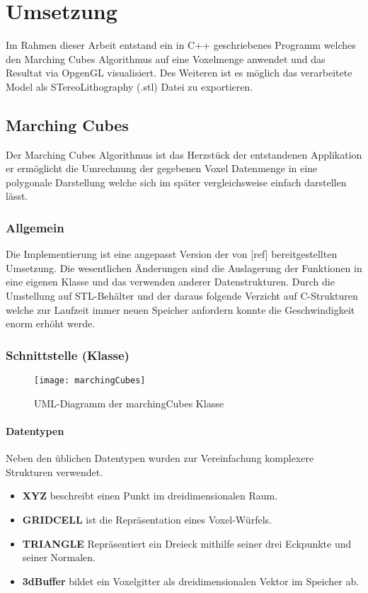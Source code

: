\chapter{Umsetzung}
Im Rahmen dieser Arbeit entstand ein in C++ geschriebenes Programm welches den Marching Cubes Algorithmus auf eine Voxelmenge anwendet und das Resultat via OpgenGL visualisiert. Des Weiteren ist es möglich das verarbeitete Model als STereoLithography (.stl) Datei zu exportieren.
\section{Marching Cubes}
Der Marching Cubes Algorithmus ist das Herzstück der entstandenen Applikation er ermöglicht die Umrechnung der gegebenen Voxel Datenmenge in eine polygonale Darstellung welche sich im später vergleichsweise einfach darstellen lässt.
\subsection{Allgemein}
Die Implementierung ist eine angepasst Version der von [ref] bereitgestellten Umsetzung. Die wesentlichen Änderungen sind die Auslagerung der Funktionen in eine eigenen Klasse und das verwenden anderer Datenstrukturen. Durch die Umstellung auf STL-Behälter und der daraus folgende Verzicht auf C-Strukturen welche zur Laufzeit immer neuen Speicher anfordern konnte die Geschwindigkeit enorm erhöht werde.
\subsection{Schnittstelle (Klasse)}
\begin{figure}[H]
	\centering
	\texttt{[image: marchingCubes]}
	\caption{UML-Diagramm der marchingCubes Klasse}
	\label{fig:marchingCubes}
\end{figure}

\subsubsection{Datentypen}
Neben den üblichen Datentypen wurden zur Vereinfachung komplexere Strukturen verwendet.\\
\begin{itemize}
	\item \textbf{XYZ} beschreibt einen Punkt im dreidimensionalen Raum.
	\item \textbf{GRIDCELL} ist die Repräsentation eines Voxel-Würfels. 
	\item \textbf{TRIANGLE} Repräsentiert ein Dreieck mithilfe seiner drei Eckpunkte und seiner Normalen.
	\item \textbf{3dBuffer} bildet ein Voxelgitter als dreidimensionalen Vektor im Speicher ab.
\end{itemize}

